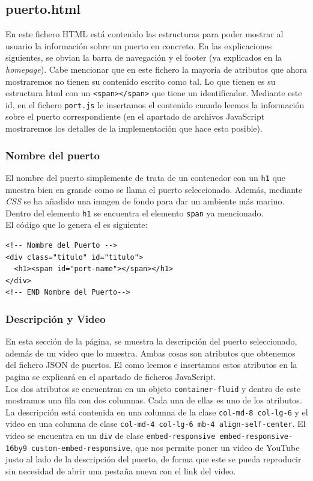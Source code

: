 \documentclass{article}
\begin{document}
\subsection{puerto.html}
En este fichero HTML está contenido las estructuras para poder mostrar al usuario la información sobre un puerto en concreto. En las explicaciones siguientes, se obvian la barra de navegación y el footer (ya explicados en la \textit{homepage}). Cabe mencionar que en este fichero la mayoria de atributos que ahora mostraremos no tienen su contenido escrito como tal. Lo que tienen es su estructura html con un \texttt{<span></span>} que tiene un identificador. Mediante este id, en el fichero \texttt{port.js} le insertamos el contenido cuando leemos la información sobre el puerto correspondiente (en el apartado de archivos JavaScript mostraremos los detalles de la implementación que hace esto posible).

\subsubsection{Nombre del puerto}
El nombre del puerto simplemente de trata de un contenedor con un \texttt{h1} que muestra bien en grande como se llama el puerto seleccionado. Además, mediante \textit{CSS} se ha añadido una imagen de fondo para dar un ambiente más marino. Dentro del elemento \texttt{h1} se encuentra el elemento \texttt{span} ya mencionado.\\

\noindent El código que lo genera el es siguiente:

\begin{verbatim}
<!-- Nombre del Puerto -->
<div class="titulo" id="titulo">
  <h1><span id="port-name"></span></h1>
</div>
<!-- END Nombre del Puerto-->    
\end{verbatim}

\subsubsection{Descripción y Video}
En esta sección de la página, se muestra la descripción del puerto seleccionado, además de un video que lo muestra. Ambas cosas son atributos que obtenemos del fichero JSON de puertos. El como leemos e insertamos estos atributos en la pagina se explicará en el apartado de ficheros JavaScript.\\

\noindent Los dos atributos se encuentran en un objeto \texttt{container-fluid} y dentro de este mostramos una fila con dos columnas. Cada una de ellas es uno de los atributos. La descripción está contenida en una columna de la clase \texttt{col-md-8 col-lg-6} y el video en una columna de clase \texttt{col-md-4 col-lg-6 mb-4 align-self-center}. El video se encuentra en un \texttt{div} de clase \texttt{embed-responsive embed-responsive-16by9 custom-embed-responsive}, que nos permite poner un video de YouTube justo al lado de la descripción del puerto, de forma que este se pueda reproducir sin necesidad de abrir una pestaña nueva con el link del video.
\end{document}
